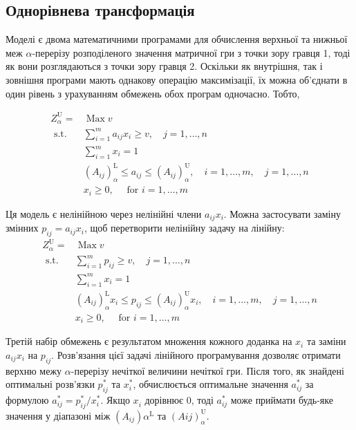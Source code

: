 \documentclass[14pt, a4paper, oneside]{extarticle}
\numberwithin{equation}{section}
\begin{document}
\subsection{Однорівнева трансформація}
Моделі є двома математичними програмами для обчислення верхньої та нижньої меж $\alpha$-перерізу розподіленого значення матричної гри з точки зору гравця 1, тоді як вони розглядаються з точки зору гравця 2. Оскільки як внутрішня, так і зовнішня програми мають однакову операцію максимізації, їх можна об'єднати в один рівень з урахуванням обмежень обох програм одночасно. Тобто,

\begin{equation}
\begin{aligned}
Z_{\alpha}^{\mathrm{U}}= & \operatorname{Max} v \\
\text { s.t. } & \sum_{i=1}^{m} a_{i j} x_{i} \geq v, \quad j=1, \ldots, n \\
& \sum_{i=1}^{m} x_{i}=1 \\
& \left(A_{i j}\right)_{\alpha}^{\mathrm{L}} \leq a_{i j} \leq\left(A_{i j}\right)_{\alpha}^{\mathrm{U}}, \quad i=1, \ldots, m, \quad j=1, \ldots, n \\
& x_{i} \geq 0, \quad \text { for } i=1, \ldots, m
\end{aligned}
\end{equation}

Ця модель є нелінійною через нелінійні члени $a_{i j} x_{i}$. Можна застосувати заміну змінних $p_{i j}=a_{i j} x_{i}$, щоб перетворити нелінійну задачу на лінійну:
\begin{equation}
\begin{aligned}
Z_{\alpha}^{\mathrm{U}}= & \operatorname{Max} v \\
\text { s.t. } & \sum_{i=1}^{m} p_{i j} \geq v, \quad j=1, \ldots, n \\
& \sum_{i=1}^{m} x_{i}=1 \\
& \left(A_{i j}\right)_{\alpha}^{\mathrm{L}} x_{i} \leq p_{i j} \leq\left(A_{i j}\right)_{\alpha}^{\mathrm{U}} x_{i}, \quad i=1, \ldots, m, \quad j=1, \ldots, n \\
& x_{i} \geq 0, \quad \text { for } i=1, \ldots, m
\end{aligned}
\end{equation}

Третій набір обмежень є результатом множення кожного доданка на $x_{i}$ та заміни $a_{i j} x_{i}$ на $p_{i j}$. Розв'язання цієї задачі лінійного програмування дозволяє отримати верхню межу $\alpha$-перерізу нечіткої величини нечіткої гри. Після того, як знайдені оптимальні розв'язки $p_{i j}^{*}$ та $x_{i}^{*}$, обчислюється оптимальне значення $a_{i j}^{*}$ за формулою $a_{i j}^{*}=p_{i j}^{*} / x_{i}^{*}$. Якщо $x_{i}^{}$ дорівнює 0, тоді $a_{i j}^{*}$ може приймати будь-яке значення у діапазоні між $\left(A_{i j}\right){\alpha}^{\mathrm{L}}$ та $\left(A{i j}\right)_{\alpha}^{\mathrm{U}}$.
\end{document}
